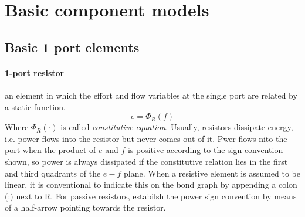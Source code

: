 \documentclass{book}
\begin{document}
\chapter{Basic component models}

\section{Basic 1 port elements}
\subsubsection{1-port resistor}
an element in which the effort and flow variables at the single port are related by a static function.
\[
    e = \Phi_R(f)
\]
Where $\Phi_R(\cdot)$ is called \emph{constitutive equation}.
Usually, resistors dissipate energy, i.e. power flows into the resistor but never comes out of it. 
Pwer flows nito the port when the product of $e$ and $f$ is positive according to the sign convention shown, so power is always dissipated if the constitutive relation lies in the first and third quadrants of the $e-f$ plane.
When a resistive element is assumed to be linear, it is conventional to indicate this on the bond graph by appending a colon (:) next to R. For passive resistors, estabilsh the power sign convention by means of a half-arrow pointing towards the resistor.
\end{document}
